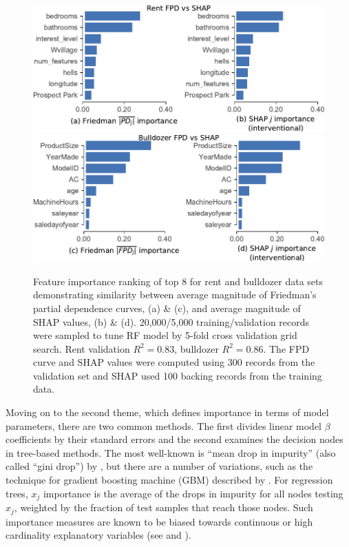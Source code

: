\documentclass[11pt]{article}
\begin{document}
\begin{figure}[htbp]
\begin{center}
\includegraphics[scale=0.53]{images/rent-pdp-vs-shap.pdf}\includegraphics[scale=0.53]{images/bulldozer-pdp-vs-shap.pdf}
\caption[short]{\small  Feature importance ranking of top 8 for rent and bulldozer data sets demonstrating similarity between average magnitude of Friedman's partial dependence curves, (a) \& (c), and average magnitude of SHAP values, (b) \& (d). 20,000/5,000 training/validation records were sampled to tune RF model by 5-fold cross validation grid search. Rent validation $R^2 = 0.83$, bulldozer $R^2 = 0.86$. The FPD curve and SHAP values were computed using 300 records from the validation set and SHAP used 100 backing records from the training data.}
\label{fig:fpd_imp}
\end{center}
\end{figure}

Moving on to the second theme, which defines importance in terms of model parameters, there are two common methods. The first divides linear model $\beta$ coefficients by their standard errors and the second examines the decision nodes in tree-based methods. The most well-known is ``mean drop in impurity'' (also called ``gini drop'') by \cite{CART}, but there are a number of variations, such as the technique for gradient boosting machine (GBM) described by \cite{PDP}. For regression trees, $x_j$ importance is the average of the drops in impurity for all nodes testing $x_j$, weighted by the fraction of test samples that reach those nodes. Such importance measures are known to be biased towards continuous or high cardinality explanatory variables (see \citealt{permbias} and \citealt{RFunbiased}).
\end{document}
